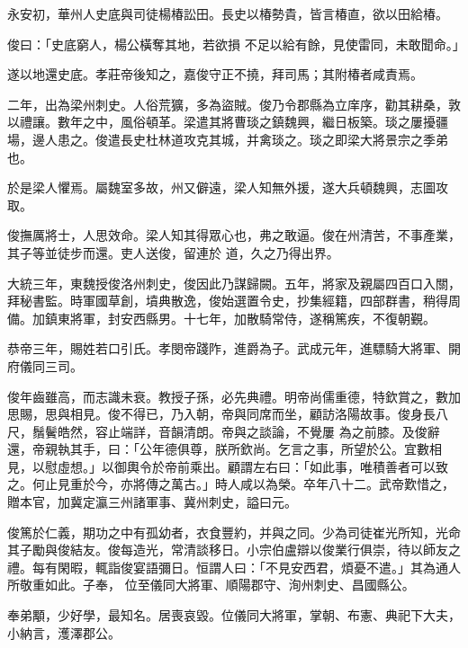 \begin{pinyinscope}
 永安初，華州人史底與司徒楊椿訟田。長史以椿勢貴，皆言椿直，欲以田給椿。



 俊曰：「史底窮人，楊公橫奪其地，若欲損
 不足以給有餘，見使雷同，未敢聞命。」



 遂以地還史底。孝莊帝後知之，嘉俊守正不撓，拜司馬；其附椿者咸責焉。



 二年，出為梁州刺史。人俗荒獷，多為盜賊。俊乃令郡縣為立庠序，勸其耕桑，敦以禮讓。數年之中，風俗頓革。梁遣其將曹琰之鎮魏興，繼日板築。琰之屢擾疆場，邊人患之。俊遣長史杜林道攻克其城，并禽琰之。琰之即梁大將景宗之季弟也。



 於是梁人懼焉。屬魏室多故，州又僻遠，梁人知無外援，遂大兵頓魏興，志圖攻取。



 俊撫厲將士，人思效命。梁人知其得眾心也，弗之敢逼。俊在州清苦，不事產業，其子等並徒步而還。吏人送俊，留連於
 道，久之乃得出界。



 大統三年，東魏授俊洛州刺史，俊因此乃謀歸闕。五年，將家及親屬四百口入關，拜秘書監。時軍國草創，墳典散逸，俊始選置令史，抄集經籍，四部群書，稍得周備。加鎮東將軍，封安西縣男。十七年，加散騎常侍，遂稱篤疾，不復朝覲。



 恭帝三年，賜姓若口引氏。孝閔帝踐阼，進爵為子。武成元年，進驃騎大將軍、開府儀同三司。



 俊年齒雖高，而志識未衰。教授子孫，必先典禮。明帝尚儒重德，特欽賞之，數加思賜，思與相見。俊不得已，乃入朝，帝與同席而坐，顧訪洛陽故事。俊身長八尺，鬚鬢皓然，容止端詳，音韻清朗。帝與之談論，不覺屢
 為之前膝。及俊辭還，帝親執其手，曰：「公年德俱尊，朕所欽尚。乞言之事，所望於公。宜數相見，以慰虛想。」以御輿令於帝前乘出。顧謂左右曰：「如此事，唯積善者可以致之。何止見重於今，亦將傳之萬古。」時人咸以為榮。卒年八十二。武帝歎惜之，贈本官，加冀定瀛三州諸軍事、冀州刺史，謚曰元。



 俊篤於仁義，期功之中有孤幼者，衣食豐約，并與之同。少為司徒崔光所知，光命其子勵與俊結友。俊每造光，常清談移日。小宗伯盧辯以俊業行俱崇，待以師友之禮。每有閑暇，輒詣俊宴語彌日。恒謂人曰：「不見安西君，煩憂不遣。」其為通人所敬重如此。子奉，
 位至儀同大將軍、順陽郡守、洵州刺史、昌國縣公。



 奉弟顒，少好學，最知名。居喪哀毀。位儀同大將軍，掌朝、布憲、典祀下大夫，小納言，濩澤郡公。




\end{pinyinscope}

